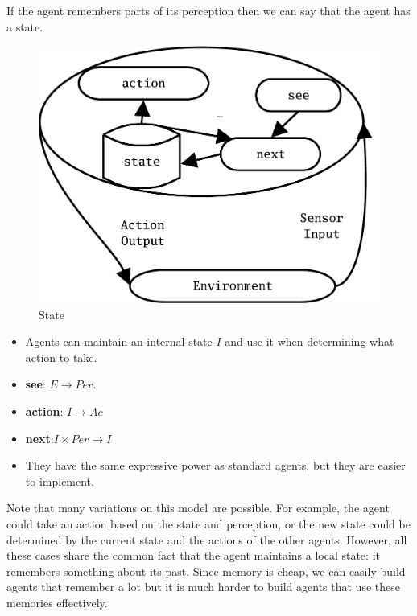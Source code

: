 If the agent remembers parts of its perception then we can say that
the agent has a state.

    \begin{figure}
      \centering
      \includegraphics[width=\textwidth]{formalmodels/state}
      \caption{State}
      \label{fig:state}
    \end{figure}

    \begin{itemize}
    \item Agents can maintain an internal state $I$ and use it when
      determining what action to take.
      
    \item \textbf{see}: $E \rightarrow Per$. 
      
    \item \textbf{action}: $I \rightarrow Ac$
      
    \item \textbf{next}:$I \times Per \rightarrow I$
      
    \item They have the same expressive power as standard agents, but they are easier to implement. 
    \end{itemize}

Note that many variations on this model are possible. For example, the
agent could take an action based on the state and perception, or the
new state could be determined by the current state and the actions of
the other agents. However, all these cases share the common fact that
the agent maintains a local state: it remembers something about its
past. Since memory is cheap, we can easily build agents that remember
a lot but it is much harder to build agents that use these memories
effectively.


